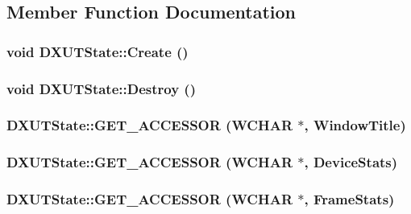 \subsection{Member Function Documentation}
\hypertarget{class_d_x_u_t_state_a10a5fd4f5f0aacb6f0eee2fd52ae3329}{
\subsubsection[{Create}]{\setlength{\rightskip}{0pt plus 5cm}void DXUTState::Create ()}}
\label{class_d_x_u_t_state_a10a5fd4f5f0aacb6f0eee2fd52ae3329}
\hypertarget{class_d_x_u_t_state_ac3f8f90b21b83e02512519a8423b9c7a}{
\subsubsection[{Destroy}]{\setlength{\rightskip}{0pt plus 5cm}void DXUTState::Destroy ()}}
\label{class_d_x_u_t_state_ac3f8f90b21b83e02512519a8423b9c7a}
\hypertarget{class_d_x_u_t_state_afc8f9df42d8ad7364a76afbc69a1c2ae}{
\subsubsection[{GET\_\-ACCESSOR}]{\setlength{\rightskip}{0pt plus 5cm}DXUTState::GET\_\-ACCESSOR (WCHAR $\ast$, \/  WindowTitle)}}
\label{class_d_x_u_t_state_afc8f9df42d8ad7364a76afbc69a1c2ae}
\hypertarget{class_d_x_u_t_state_a1695dda0b58c0780cc679c5c30fc0d8e}{
\subsubsection[{GET\_\-ACCESSOR}]{\setlength{\rightskip}{0pt plus 5cm}DXUTState::GET\_\-ACCESSOR (WCHAR $\ast$, \/  DeviceStats)}}
\label{class_d_x_u_t_state_a1695dda0b58c0780cc679c5c30fc0d8e}
\hypertarget{class_d_x_u_t_state_aebdf3b3dfa93bd3cd58a3411e8f0b2f0}{
\subsubsection[{GET\_\-ACCESSOR}]{\setlength{\rightskip}{0pt plus 5cm}DXUTState::GET\_\-ACCESSOR (WCHAR $\ast$, \/  FrameStats)}}
